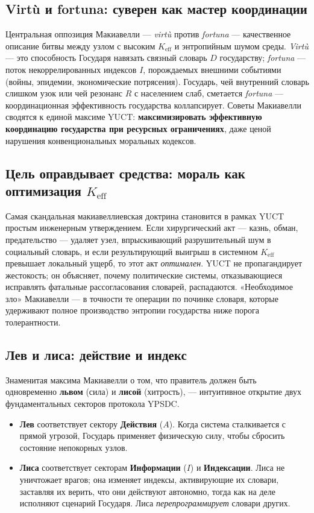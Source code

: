 \documentclass[12pt,a4paper]{article}
\begin{document}
	\subsection{Virtù и fortuna: суверен как мастер координации}
	
	Центральная оппозиция Макиавелли — \emph{virtù} против \emph{fortuna} — качественное описание битвы между узлом с высоким \(K_{\mathrm{eff}}\) и энтропийным шумом среды. \emph{Virtù} — это способность Государя навязать связный словарь \(D\) государству; \emph{fortuna} — поток некоррелированных индексов \(I\), порождаемых внешними событиями (войны, эпидемии, экономические потрясения). Государь, чей внутренний словарь слишком узок или чей резонанс \(R\) с населением слаб, сметается \emph{fortuna} — координационная эффективность государства коллапсирует. Советы Макиавелли сводятся к единой максиме YUCT: \textbf{максимизировать эффективную координацию государства при ресурсных ограничениях}, даже ценой нарушения конвенциональных моральных кодексов.
	
	\subsection{Цель оправдывает средства: мораль как оптимизация \(K_{\mathrm{eff}}\)}
	
	Самая скандальная макиавеллиевская доктрина становится в рамках YUCT простым инженерным утверждением. Если хирургический акт — казнь, обман, предательство — удаляет узел, впрыскивающий разрушительный шум в социальный словарь, и если результирующий выигрыш в системном \(K_{\mathrm{eff}}\) превышает локальный ущерб, то этот акт \emph{оптимален}. YUCT не пропагандирует жестокость; он объясняет, почему политические системы, отказывающиеся исправлять фатальные рассогласования словарей, распадаются. «Необходимое зло» Макиавелли — в точности те операции по починке словаря, которые удерживают полное производство энтропии государства ниже порога толерантности.
	
	\subsection{Лев и лиса: действие и индекс}
	
	Знаменитая максима Макиавелли о том, что правитель должен быть одновременно \textbf{львом} (сила) и \textbf{лисой} (хитрость), — интуитивное открытие двух фундаментальных секторов протокола YPSDC.
	
	\begin{itemize}[leftmargin=*]
		\item \textbf{Лев} соответствует сектору \textbf{Действия} (\(A\)). Когда система сталкивается с прямой угрозой, Государь применяет физическую силу, чтобы сбросить состояние непокорных узлов.
		\item \textbf{Лиса} соответствует секторам \textbf{Информации} (\(I\)) и \textbf{Индексации}. Лиса не уничтожает врагов; она изменяет индексы, активирующие их словари, заставляя их верить, что они действуют автономно, тогда как на деле исполняют сценарий Государя. Лиса \emph{перепрограммирует} словари других.
	\end{itemize}
	
\end{document}
